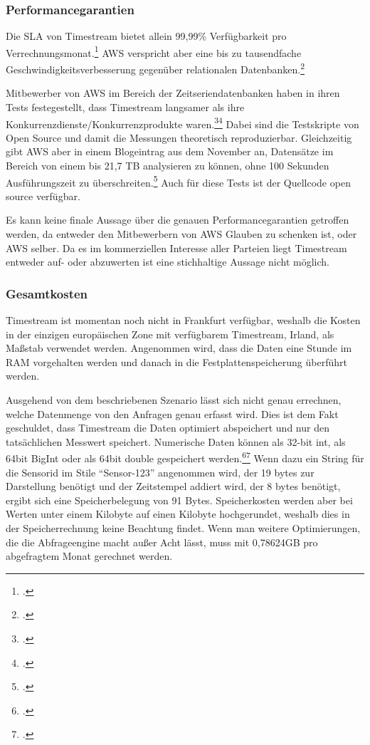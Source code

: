 \subsubsection{Performancegarantien}
Die \ac{SLA} von Timestream bietet allein 99,99\% Verfügbarkeit pro Verrechnungsmonat.\footcite[Vgl.][]{AmazonWebServicesInc..2020d} \ac{AWS} verspricht aber eine bis zu tausendfache Geschwindigkeitsverbesserung gegenüber relationalen Datenbanken.\footcite[Vgl.][]{AmazonWebServicesInc..o.J.ak}

Mitbewerber von \ac{AWS} im Bereich der Zeitseriendatenbanken haben in ihren Tests festegestellt, dass Timestream langsamer als ihre Konkurrenzdienste/Konkurrenzprodukte waren.\footcite[Vgl.][]{Booz.2020}\nzitat\footcite[Vgl.][]{Crate.ioInc..2020} Dabei sind die Testskripte von \citeauthor{Booz.2020} Open Source und damit die Messungen theoretisch reproduzierbar. Gleichzeitig gibt \ac{AWS} aber in einem Blogeintrag aus dem November an, Datensätze im Bereich von einem bis 21,7 TB analysieren zu können, ohne 100 Sekunden Ausführungszeit zu überschreiten.\footcite[Vgl.][]{Das.2020} Auch für diese Tests ist der Quellcode open source verfügbar.

Es kann keine finale Aussage über die genauen Performancegarantien getroffen werden, da entweder den Mitbewerbern von \ac{AWS} Glauben zu schenken ist, oder \ac{AWS} selber. Da es im kommerziellen Interesse aller Parteien liegt Timestream entweder auf- oder abzuwerten ist eine stichhaltige Aussage nicht möglich.

\subsubsection{Gesamtkosten}


Timestream ist momentan noch nicht in Frankfurt verfügbar, weshalb die Kosten in der einzigen europäischen Zone mit verfügbarem Timestream, Irland, als Maßstab verwendet werden. Angenommen wird, dass die Daten eine Stunde im \ac{RAM} vorgehalten werden und danach in die Festplattenspeicherung überführt werden.


Ausgehend von dem beschriebenen Szenario lässt sich nicht genau errechnen, welche Datenmenge von den Anfragen genau erfasst wird. Dies ist dem Fakt geschuldet, dass Timestream die Daten optimiert abspeichert und nur den tatsächlichen Messwert speichert. Numerische Daten können als 32-bit int, als 64bit BigInt oder als 64bit double gespeichert werden.\footcite[Vgl. auch im Folgenden][]{AmazonWebServicesInc..o.J.r}\nzitat\footcite[Vgl. auch im Folgenden][]{AmazonWebServicesInc..o.J.q} Wenn dazu ein String für die Sensorid im Stile \enquote{Sensor-123} angenommen wird, der 19 bytes zur Darstellung benötigt und der Zeitstempel addiert wird, der 8 bytes benötigt, ergibt sich eine Speicherbelegung von 91 Bytes. Speicherkosten werden aber bei Werten unter einem Kilobyte auf einen Kilobyte hochgerundet, weshalb dies in der Speicherrechnung keine Beachtung findet. Wenn man weitere Optimierungen, die die Abfrageengine macht außer Acht lässt, muss mit 0,78624GB pro abgefragtem Monat gerechnet werden.


